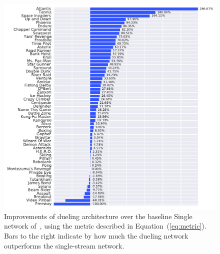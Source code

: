 

\begin{figure}[t!]
\begin{center}
	\includegraphics[scale=0.47]{./figs/DG05_vs_DQBa}
\end{center}
\caption{\label{fig:at30} Improvements of dueling architecture over the baseline Single network of~\citet{vanHasselt:2015}, using the metric described in Equation~(\ref{eq:metric}). Bars to the right indicate by how much the dueling network outperforms the single-stream network.}
\end{figure}

